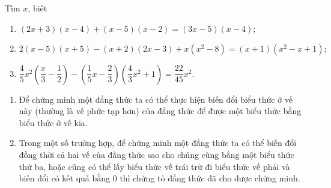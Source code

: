 \begin{vd}
	Tìm $x$, biết
	\begin{enumerate}
		\item $(2x+3)(x-4)+(x-5)(x-2)=(3x-5)(x-4);$
		\item $2(x-5)(x+5)-(x+2)(2x-3)+x(x^2-8)=(x+1)(x^2-x+1);$
		\item $\dfrac{4}{5}x^2 \left(\dfrac{x}{3}-\dfrac{1}{2}\right)-\left(\dfrac{1}{5}x-\dfrac{2}{3}\right)\left(\dfrac{4}{3}x^2+1\right)=\dfrac{22}{45}x^2.$
	\end{enumerate}
\end{vd}
\begin{dang}
	\begin{enumerate}[\tickEX]
		\item Để chứng minh một đẳng thức ta có thể thực hiện biến đổi biểu thức ở vế này (thường là vế phức tạp hơn) của đẳng thức để được một biểu thức bằng biểu thức ở vế kia.
		\item Trong một số trường hợp, để chứng minh một đẳng thức ta có thể biến đổi đồng thời cả hai vế của đẳng thức sao cho chúng cùng bằng một biểu thức thứ ba, hoặc cũng có thể lấy biểu thức vế trái trừ đi biểu thức vế phải và biến đổi có kết quả bằng $0$ thì chứng tỏ đẳng thức đã cho được chứng minh.
	\end{enumerate}	
\end{dang}
